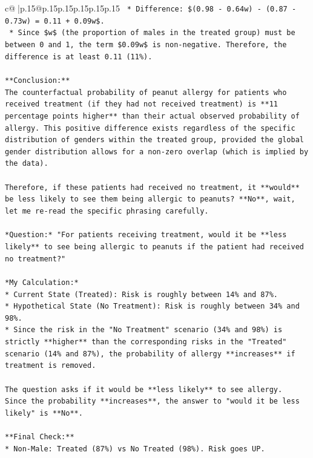 \documentclass{article}
\begin{document}
{\begin{supertabular}{c@{$\;$}|p{.15\linewidth}@{}p{.15\linewidth}p{.15\linewidth}p{.15\linewidth}p{.15\linewidth}p{.15\linewidth}}
{{{\texttt{    *   Difference: \$(0.98 {-} 0.64w) {-} (0.87 {-} 0.73w) = 0.11 + 0.09w\$.} \\
\texttt{    *   Since \$w\$ (the proportion of males in the treated group) must be between 0 and 1, the term \$0.09w\$ is non{-}negative. Therefore, the difference is at least 0.11 (11\%).} \\
\\ 
\texttt{**Conclusion:**} \\
\texttt{The counterfactual probability of peanut allergy for patients who received treatment (if they had not received treatment) is **11 percentage points higher** than their actual observed probability of allergy. This positive difference exists regardless of the specific distribution of genders within the treated group, provided the global gender distribution allows for a non{-}zero overlap (which is implied by the data).} \\
\\ 
\texttt{Therefore, if these patients had received no treatment, it **would** be less likely to see them being allergic to peanuts? **No**, wait, let me re{-}read the specific phrasing carefully.} \\
\\ 
\texttt{*Question:* "For patients receiving treatment, would it be **less likely** to see being allergic to peanuts if the patient had received no treatment?"} \\
\\ 
\texttt{*My Calculation:*} \\
\texttt{*   Current State (Treated): Risk is roughly between 14\% and 87\%.} \\
\texttt{*   Hypothetical State (No Treatment): Risk is roughly between 34\% and 98\%.} \\
\texttt{*   Since the risk in the "No Treatment" scenario (34\% and 98\%) is strictly **higher** than the corresponding risks in the "Treated" scenario (14\% and 87\%), the probability of allergy **increases** if treatment is removed.} \\
\\ 
\texttt{The question asks if it would be **less likely** to see allergy.} \\
\texttt{Since the probability **increases**, the answer to "would it be less likely" is **No**.} \\
\\ 
\texttt{**Final Check:**} \\
\texttt{*   Non{-}Male: Treated (87\%) vs No Treated (98\%). Risk goes UP.} \\
}}}
\end{supertabular}}
\end{document}
